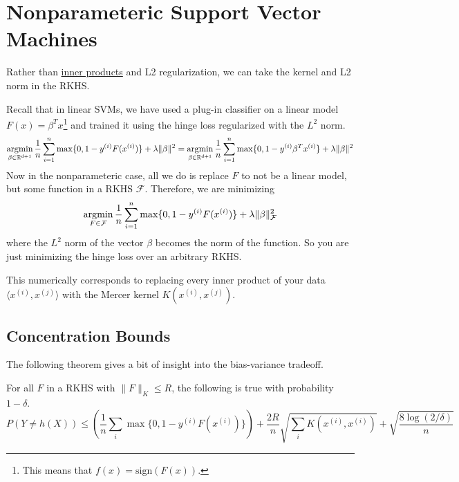 \section{Nonparameteric Support Vector Machines} 

  Rather than \hyperref[lin-def:inner-product]{inner products} and L2 regularization, we can take the kernel and L2 norm in the RKHS.  

  Recall that in linear SVMs, we have used a plug-in classifier on a linear model $F(x) = \beta^T x$\footnote{This means that $f(x) = \mathrm{sign}(F(x))$.} and trained it using the hinge loss regularized with the $L^2$ norm. 
  \begin{equation}
    \operatorname*{\arg\!\min}_{\beta \in \mathbb{R}^{d+1}} \frac{1}{n} \sum_{i=1}^n \max\{0, 1 - y^{(i)} F(x^{(i)})\} + \lambda \|\beta\|^2 = \operatorname*{\arg\!\min}_{\beta \in \mathbb{R}^{d+1}} \frac{1}{n} \sum_{i=1}^n \max\{0, 1 - y^{(i)} \beta^T x^{(i)}\} + \lambda \|\beta\|^2
  \end{equation}
  Now in the nonparameteric case, all we do is replace $F$ to not be a linear model, but some function in a RKHS $\mathcal{F}$. Therefore, we are minimizing 
  \begin{equation}
    \operatorname*{\arg\!\min}_{F \in \mathcal{F}} \frac{1}{n} \sum_{i=1}^n \max\{0, 1 - y^{(i)} F(x^{(i)})\} + \lambda \|\beta\|_{\mathcal{F}}^2
  \end{equation}
  where the $L^2$ norm of the vector $\beta$ becomes the norm of the function. So you are just minimizing the hinge loss over an arbitrary RKHS. 

  This numerically corresponds to replacing every inner product of your data $\langle x^{(i)}, x^{(j)} \rangle$ with the Mercer kernel $K(x^{(i)}, x^{(j)})$. 


\subsection{Concentration Bounds} 

  The following theorem gives a bit of insight into the bias-variance tradeoff. 

  \begin{theorem}
    \label{thm:blanchard-bosquet-massert-2008}
    For all $F$ in a RKHS with $\|F\|_K \leq R$, the following is true with probability $1 - \delta$. 
    \begin{equation}
      P(Y \neq h(X)) \leq \left( \frac{1}{n} \sum_{i} \max\{0, 1 - y^{(i)} F(x^{(i)})\} \right) + \frac{2R}{n} \sqrt{\sum_i K(x^{(i)}, x^{(i)})} + \sqrt{\frac{8 \log(2/\delta)}{n}}
    \end{equation}
  \end{theorem}

